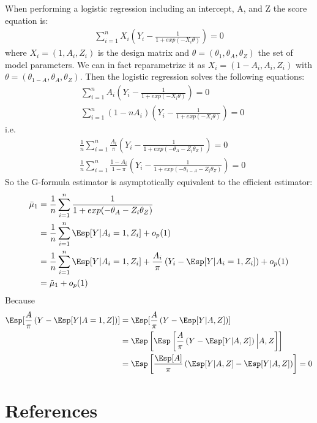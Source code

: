 \documentclass[12pt]{article}
\begin{document}
When performing a logistic regression including an intercept, A, and Z
the score equation is:
\begin{align*}
\sum_{i=1}^n X_i \left(Y_i - \frac{1}{1+exp(-X_i \theta)}\right) = 0
\end{align*}
where \(X_i = (1,A_i,Z_i)\) is the design matrix and
\(\theta=(\theta_1,\theta_A,\theta_Z)\) the set of model
parameters. We can in fact reparametrize it as \(X_i =
(1-A_i,A_i,Z_i)\) with
\(\theta=(\theta_{1-A},\theta_A,\theta_Z)\). Then the logistic
regression solves the following equations:
\begin{align*}
&\sum_{i=1}^n A_i \left(Y_i - \frac{1}{1+exp(-X_i \theta)}\right) = 0 \\
&\sum_{i=1}^n (1-n A_i) \left(Y_i - \frac{1}{1+exp(-X_i \theta)}\right) = 0
\end{align*}
i.e.
\begin{align*}
&\frac{1}{n} \sum_{i=1}^n \frac{A_i}{\pi} \left(Y_i - \frac{1}{1+exp(-\theta_{A}-Z_i \theta_Z)}\right) = 0 \\
&\frac{1}{n}  \sum_{i=1}^n \frac{1 - A_i}{1-\pi} \left(Y_i - \frac{1}{1+exp(-\theta_{1-A}-Z_i \theta_Z)}\right) = 0
\end{align*}
So the G-formula estimator is asymptotically equivalent to the efficient estimator:
\begin{align*}
\bar{\mu}_1 &= \frac{1}{n} \sum_{i=1}^n \frac{1}{1+exp(-\theta_{A}-Z_i \theta_Z)} \\
            &= \frac{1}{n} \sum_{i=1}^n \Esp[Y|A_i=1,Z_i] + o_p(1) \\
            &= \frac{1}{n} \sum_{i=1}^n \Esp[Y|A_i=1,Z_i] + \frac{A_i}{\pi}\left(Y_i - \Esp[Y|A_i=1,Z_i]\right) + o_p(1) \\
            &= \tilde{\mu}_1 + o_p(1)
\end{align*}
Because
\begin{align*}
\Esp[\frac{A}{\pi}\left(Y - \Esp[Y|A=1,Z]\right)] &= \Esp[\frac{A}{\pi}\left(Y - \Esp[Y|A,Z]\right)] \\
&= \Esp\left[\Esp\left[\frac{A}{\pi}\left(Y - \Esp[Y|A,Z]\right)\Big|A,Z\right]\right] \\
&= \Esp\left[\frac{\Esp[A]}{\pi}\left(\Esp[Y|A,Z] - \Esp[Y|A,Z]\right)\right] = 0
\end{align*}

\section{References}
\label{sec:orgf3010e4}
\begingroup
\renewcommand{\section}[2]{}



\endgroup
\end{document}
